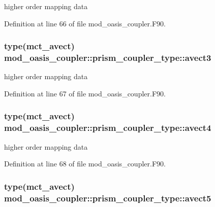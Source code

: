 higher order mapping data 



Definition at line 66 of file mod\+\_\+oasis\+\_\+coupler.\+F90.

\hypertarget{structmod__oasis__coupler_1_1prism__coupler__type_ac923618471bb31902062be4107d9bbf3}{
\subsubsection[{avect3}]{\setlength{\rightskip}{0pt plus 5cm}type(mct\+\_\+avect) mod\+\_\+oasis\+\_\+coupler\+::prism\+\_\+coupler\+\_\+type\+::avect3\hspace{0.3cm}{\ttfamily [private]}}}\label{structmod__oasis__coupler_1_1prism__coupler__type_ac923618471bb31902062be4107d9bbf3}


higher order mapping data 



Definition at line 67 of file mod\+\_\+oasis\+\_\+coupler.\+F90.

\hypertarget{structmod__oasis__coupler_1_1prism__coupler__type_a478dda1acb9e270efda23a7275b21b83}{
\subsubsection[{avect4}]{\setlength{\rightskip}{0pt plus 5cm}type(mct\+\_\+avect) mod\+\_\+oasis\+\_\+coupler\+::prism\+\_\+coupler\+\_\+type\+::avect4\hspace{0.3cm}{\ttfamily [private]}}}\label{structmod__oasis__coupler_1_1prism__coupler__type_a478dda1acb9e270efda23a7275b21b83}


higher order mapping data 



Definition at line 68 of file mod\+\_\+oasis\+\_\+coupler.\+F90.

\hypertarget{structmod__oasis__coupler_1_1prism__coupler__type_a939d1987d5c66c2352ff40709f255980}{
\subsubsection[{avect5}]{\setlength{\rightskip}{0pt plus 5cm}type(mct\+\_\+avect) mod\+\_\+oasis\+\_\+coupler\+::prism\+\_\+coupler\+\_\+type\+::avect5\hspace{0.3cm}{\ttfamily [private]}}}\label{structmod__oasis__coupler_1_1prism__coupler__type_a939d1987d5c66c2352ff40709f255980}


